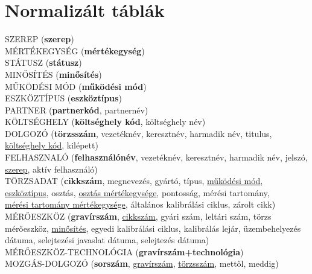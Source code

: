 \documentclass[a4paper,12pt]{report}
\newcommand{\pk}[1]{\textbf{#1}} %
\newcommand{\fk}[1]{\underline{#1}} %
\newcommand{\tabla}[1]{\noindent\MakeUppercase{#1}} %
\begin{document}
\section{Normalizált táblák}
%

\tabla{szerep} (\pk{szerep})\\

\tabla{mértékegység} (\pk{mértékegység})\\

\tabla{státusz} (\pk{státusz})\\

\tabla{minősítés} (\pk{minősítés})\\

\tabla{működési mód} (\pk{működési mód})\\

\tabla{eszköztípus} (\pk{eszköztípus})\\

\tabla{partner} (\pk{partnerkód}, partnernév)\\

\tabla{költséghely} (\pk{költséghely kód}, költséghely név)\\

\tabla{dolgozó} (\pk{törzsszám}, vezetéknév, keresztnév, harmadik név,
 titulus,\\ \fk{költséghely kód}, kilépett)\\
 
\tabla{felhasznaló} (\pk{felhasználónév}, vezetéknév, keresztnév, harmadik név, jelszó,
\fk{szerep}, aktív felhasználó)\\

\tabla{törzsadat} (\pk{cikkszám}, megnevezés, gyártó, típus, \fk{működési mód},
 \fk{eszköztípus}, osztás, \fk{osztás mértékegysége}, pontosság, mérési tartomány, \\
\fk{mérési tartomány mértékegysége}, általános kalibrálási ciklus, zárolt cikk)\\

\tabla{mérőeszköz} (\pk{gravírszám}, \fk{cikkszám}, gyári szám, leltári szám,
törzs mérőeszköz, \fk{minősítés}, egyedi kalibrálási ciklus, kalibrálás lejár, üzembehelyezés
dátuma, selejtezési javaslat dátuma, selejtezés dátuma)\\

\tabla{mérőeszköz-technológia} (\pk{gravírszám+technológia})\\

\tabla{mozgás-dolgozó} (\pk{sorszám}, \fk{gravírszám}, \fk{törzsszám}, mettől, meddig)\\
\end{document}
